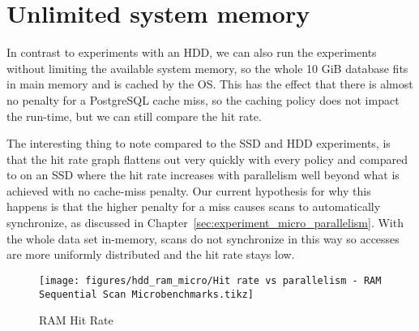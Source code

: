 \section{Unlimited system memory}
In contrast to experiments with an HDD, we can also run the experiments without limiting the available system memory, so the whole 10 GiB database fits in main memory and is cached by the OS. This has the effect that there is almost no penalty for a PostgreSQL cache miss, so the caching policy does not impact the run-time, but we can still compare the hit rate.

The interesting thing to note compared to the SSD and HDD experiments, is that the hit rate graph flattens out very quickly with every policy and compared to on an SSD where the hit rate increases with parallelism well beyond what is achieved with no cache-miss penalty. Our current hypothesis for why this happens is that the higher penalty for a miss causes scans to automatically synchronize, as discussed in Chapter~\ref{sec:experiment_micro_parallelism}. %
With the whole data set in-memory, scans do not synchronize in this way so accesses are more uniformly distributed and the hit rate stays low.


\begin{figure}[ht]
    \centering
    \texttt{[image: figures/hdd\_ram\_micro/Hit rate vs parallelism - RAM Sequential Scan Microbenchmarks.tikz]}
    \caption{RAM Hit Rate}
    \label{fig:ram_hitrate}
\end{figure}
